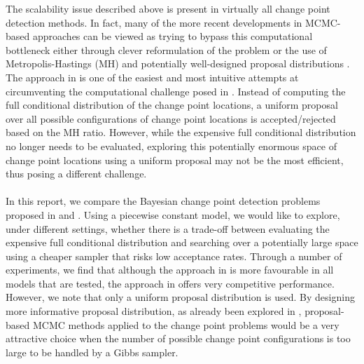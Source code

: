 The scalability issue described above is present in virtually all change point detection methods. In fact, many of the more recent developments in MCMC-based approaches can be viewed as trying to bypass this computational bottleneck either through clever reformulation of the problem \cite{stephens1994bayesian,lavielle2001application} or the use of Metropolis-Hastings (MH) and potentially well-designed proposal distributions \cite{green1995reversible,antoch2008application}. The approach in \cite{antoch2008application} is one of the easiest and most intuitive attempts at circumventing the computational challenge posed in \cite{carlin1992hierarchical}. Instead of computing the full conditional distribution of the change point locations, a uniform proposal over all possible configurations of change point locations is accepted/rejected based on the MH ratio. However, while the expensive full conditional distribution no longer needs to be evaluated, exploring this potentially enormous space of change point locations using a uniform proposal may not be the most efficient, thus posing a different challenge.\\\\
In this report, we compare the Bayesian change point detection problems proposed in \cite{carlin1992hierarchical} and \cite{antoch2008application}. Using a piecewise constant model, we would like to explore, under different settings, whether there is a trade-off between evaluating the expensive full conditional distribution and searching over a potentially large space using a cheaper sampler that risks low acceptance rates. Through a number of experiments, we find that although the approach in \cite{carlin1992hierarchical} is more favourable in all models that are tested, the approach in \cite{antoch2008application} offers very competitive performance. However, we note that only a uniform proposal distribution is used. By designing more informative proposal distribution, as already been explored in \cite{benson2018adaptive}, proposal-based MCMC methods applied to the change point problems would be a very attractive choice when the number of possible change point configurations is too large to be handled by a Gibbs sampler.

